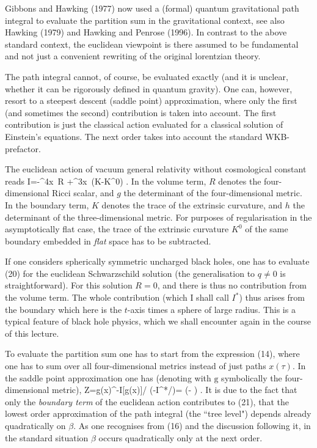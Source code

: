 Gibbons and Hawking (1977) now used a (formal) quantum gravitational
path integral to evaluate the partition sum in the gravitational
context, see also Hawking (1979) and Hawking and Penrose (1996).
In contrast to the above standard context, the euclidean 
viewpoint is there assumed to be fundamental and not just a convenient
rewriting of the original lorentzian theory.      

The path integral cannot, of course, be evaluated exactly
(and it is unclear, whether it can be rigorously defined in
quantum gravity). One can, however, resort to a steepest descent
(saddle point) approximation, where only the first (and sometimes the second)
contribution is taken into account. The first contribution
is just the classical action evaluated for a classical
solution of Einstein's equations. The next order takes into
account the standard WKB-prefactor.

 The euclidean action of vacuum general relativity without
  cosmological constant reads
\be I=-\int\D^4x\ R
    +\int\D^3x\ (K-K^0) \enspace . \ee
In the volume term, $R$ denotes the four-dimensional Ricci scalar, and $g$
the determinant of the four-dimensional metric. In the boundary term,
$K$ denotes the trace of the extrinsic curvature, and $h$ the determinant
of the three-dimensional metric.
 For purposes of regularisation
in the asymptotically flat case,
the trace of the extrinsic curvature $K^0$ of the same boundary
embedded in {\em flat} space has to be subtracted. 

If one considers spherically symmetric uncharged black holes,
one has to evaluate (20) for the euclidean Schwarzschild solution
(the generalisation to $q\neq 0$ is straightforward).
For this solution $R=0$, and there is thus no contribution
from the volume term. The whole contribution
(which I shall call $I^*$) thus arises
from the boundary which here is the $t$-axis times a sphere of 
large radius. This is a typical feature of black hole physics,
which we shall encounter again in the course of this lecture. 

To evaluate the partition sum one has to start from the expression
(14), where one has to sum over all four-dimensional metrics
instead of just paths $x(\tau)$. In the saddle point approximation
one has (denoting with $\mbox{g}$ symbolically the four-dimensional
metric),
\be Z=\mbox{g}(x)\E^{-I[\mbox{g}(x)]/\hbar}
    \approx\exp(-I^*/\hbar)= \exp\left(-
    \right) \enspace . \ee
It is due to the fact that only the {\em boundary term} of the euclidean
action contributes to (21), that the lowest order approximation
of the path integral (the ``tree level") depends already
quadratically on $\beta$. As one recognises from (16) and the
discussion following it,
in the standard situation $\beta$ occurs quadratically only at the
next order. 

